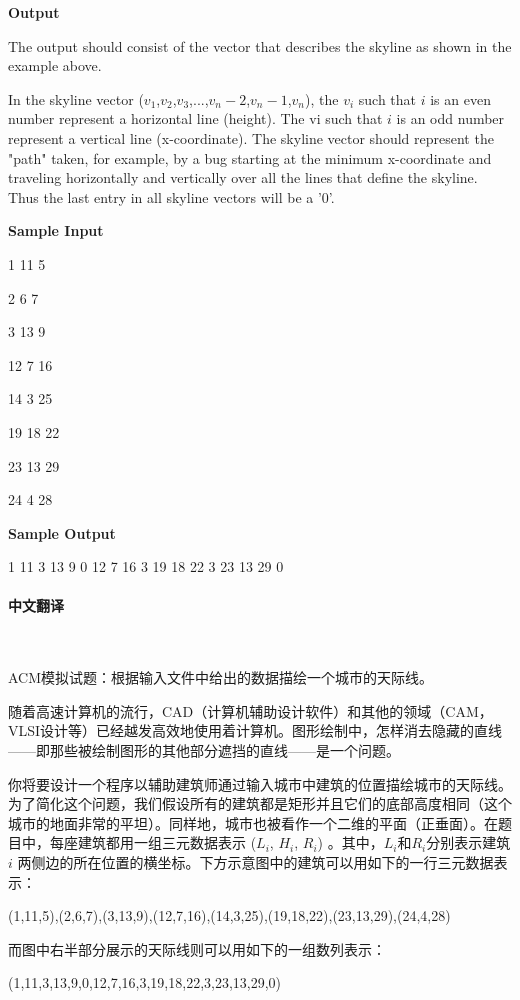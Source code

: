 \documentclass[a4paper]{ctexart}
\begin{document}
	\textbf{Output}

	The output should consist of the vector that describes the skyline as shown in the example above.
	
	In the skyline vector ($v_1$,$v_2$,$v_3$,...,$v_n-2$,$v_n-1$,$v_n$), the $v_i$ such that $i$ is an even number represent a horizontal line (height). The vi such that $i$ is an odd number represent a vertical line (x-coordinate). The skyline vector should represent the "path" taken, for example, by a bug starting at the minimum x-coordinate and traveling horizontally and vertically over all the lines that define the skyline. Thus the last entry in all skyline vectors will be a '0'.
	
	\textbf{Sample Input}

	1 11 5

	2 6 7

	3 13 9

	12 7 16

	14 3 25

	19 18 22

	23 13 29

	24 4 28

	\textbf{Sample Output}

	1 11 3 13 9 0 12 7 16 3 19 18 22 3 23 13 29 0



	\paragraph{中文翻译}~

	ACM模拟试题：根据输入文件中给出的数据描绘一个城市的天际线。

	随着高速计算机的流行，CAD（计算机辅助设计软件）和其他的领域（CAM，VLSI设计等）已经越发高效地使用着计算机。图形绘制中，怎样消去隐藏的直线——即那些被绘制图形的其他部分遮挡的直线——是一个问题。

	你将要设计一个程序以辅助建筑师通过输入城市中建筑的位置描绘城市的天际线。为了简化这个问题，我们假设所有的建筑都是矩形并且它们的底部高度相同（这个城市的地面非常的平坦）。同样地，城市也被看作一个二维的平面（正垂面）。在题目中，每座建筑都用一组三元数据表示 ($L_i$, $H_i$, $R_i$) 。其中，$L_i$和$R_i$分别表示建筑 $i$ 两侧边的所在位置的横坐标。下方示意图中的建筑可以用如下的一行三元数据表示：

	(1,11,5),(2,6,7),(3,13,9),(12,7,16),(14,3,25),(19,18,22),(23,13,29),(24,4,28)

	而图中右半部分展示的天际线则可以用如下的一组数列表示：

	(1,11,3,13,9,0,12,7,16,3,19,18,22,3,23,13,29,0)
	
\end{document}
